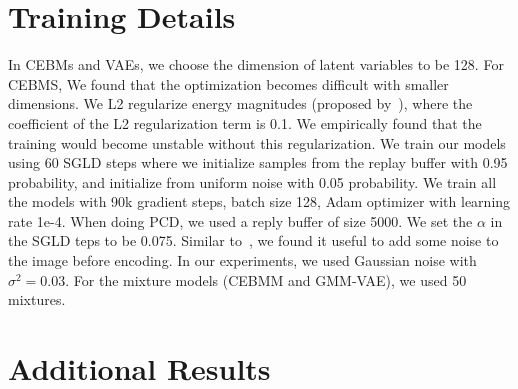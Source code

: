 \section{Training Details}
\label{appendix-sec:training-details}
In CEBMs and VAEs, we choose the dimension of latent variables to be 128. For CEBMS, We found that the optimization becomes difficult with smaller dimensions. We L2 regularize energy magnitudes (proposed by~\citet{du2019implicit}), where the coefficient of the L2 regularization term is 0.1. We empirically found that the training would become unstable without this regularization. We train our models using 60 SGLD steps where we initialize samples from the replay buffer with 0.95 probability, and initialize from uniform noise with 0.05 probability. We train all the models with 90k gradient steps, batch size 128, Adam optimizer with learning rate 1e-4. When doing PCD, we used a reply buffer of size 5000. We set the $\alpha$ in the SGLD teps to be 0.075. Similar to~\citet{du2019implicit}, we found it useful to add some noise to the image before encoding. In our experiments, we used Gaussian noise with $\sigma^{2} = 0.03$. For the mixture models (CEBMM and GMM-VAE), we used 50 mixtures.  

\newpage
\section{Additional Results}
\label{app:sec:additional-results}

